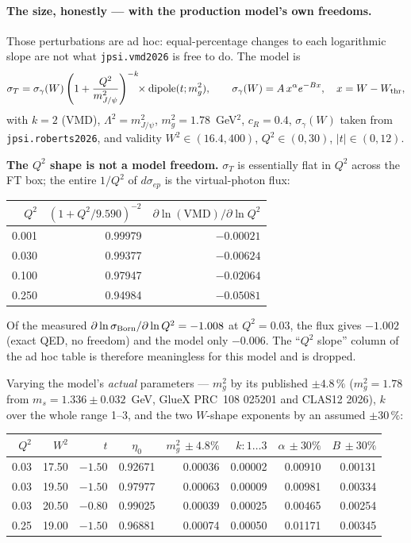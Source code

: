 \documentclass[11pt]{article}
\begin{document}
\paragraph{The size, honestly --- with the production model's own freedoms.}
Those perturbations are ad hoc: equal-percentage changes to each logarithmic slope are not what
\texttt{jpsi.vmd2026} is free to do. The model is
\begin{equation}
\sigma_T=\sigma_\gamma(W)\left(1+\frac{Q^2}{m_{J/\psi}^2}\right)^{-k}\!\!\times\text{dipole}(t;m_g^2),
\qquad
\sigma_\gamma(W)=A\,x^{\alpha}e^{-Bx},\quad x=W-W_{\rm thr},
\end{equation}
with $k=2$ (VMD), $\Lambda^2=m_{J/\psi}^2$, $m_g^2=1.78$~GeV$^2$, $c_R=0.4$, $\sigma_\gamma(W)$ taken
from \texttt{jpsi.roberts2026}, and validity $W^2\in(16.4,400)$, $Q^2\in(0,30)$, $|t|\in(0,12)$.

\textbf{The $Q^2$ shape is not a model freedom.} $\sigma_T$ is essentially flat in $Q^2$ across the
FT box; the entire $1/Q^2$ of $d\sigma_{ep}$ is the virtual-photon flux:

\begin{center}\small
\begin{tabular}{rrr}
\toprule
$Q^2$ & $(1+Q^2/9.590)^{-2}$ & $\partial\ln(\mathrm{VMD})/\partial\ln Q^2$ \\
\midrule
0.001 & 0.99979 & $-0.00021$ \\
0.030 & 0.99377 & $-0.00624$ \\
0.100 & 0.97947 & $-0.02064$ \\
0.250 & 0.94984 & $-0.05081$ \\
\bottomrule
\end{tabular}
\end{center}

\noindent Of the measured $\partial\ln\sigma_{\rm Born}/\partial\ln Q^2=-1.008$ at $Q^2=0.03$, the
flux gives $-1.002$ (exact QED, no freedom) and the model only $-0.006$. The ``$Q^2$ slope'' column
of the ad hoc table is therefore meaningless for this model and is dropped.

Varying the model's \emph{actual} parameters --- $m_g^2$ by its published $\pm4.8\,\%$ ($m_g^2=1.78$
from $m_s=1.336\pm0.032$~GeV, GlueX PRC~108 025201 and CLAS12 2026), $k$ over the whole range 1--3,
and the two $W$-shape exponents by an assumed $\pm30\,\%$:

\begin{center}\small
\begin{tabular}{rrrcrrrr}
\toprule
$Q^2$ & $W^2$ & $t$ & $\eta_0$ & $m_g^2\,{\pm}4.8\%$ & $k:1\ldots3$ & $\alpha\,{\pm}30\%$ & $B\,{\pm}30\%$ \\
\midrule
0.03 & 17.50 & $-1.50$ & 0.92671 & 0.00036 & 0.00002 & 0.00910 & 0.00131 \\
0.03 & 19.50 & $-1.50$ & 0.97977 & 0.00063 & 0.00009 & 0.00981 & 0.00334 \\
0.03 & 20.50 & $-0.80$ & 0.99025 & 0.00039 & 0.00025 & 0.00465 & 0.00254 \\
0.25 & 19.00 & $-1.50$ & 0.96881 & 0.00074 & 0.00050 & 0.01171 & 0.00345 \\
\bottomrule
\end{tabular}
\end{center}
\end{document}
